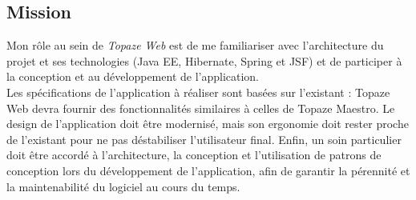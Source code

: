 \subsection{Mission}
Mon rôle au sein de \textit{Topaze Web} est de me familiariser avec l'architecture du projet et ses technologies (\gls{Java EE}, \gls{Hibernate}, \gls{Spring} et \gls{JSF}) et de participer à la conception et au développement de l'application.\\

Les spécifications de l’application à réaliser sont basées sur l'existant : Topaze Web devra fournir des fonctionnalités similaires à celles de Topaze Maestro. Le design de l'application doit être modernisé, mais son ergonomie doit rester proche de l'existant pour ne pas déstabiliser l'utilisateur final. Enfin, un soin particulier doit être accordé à l'architecture, la conception et l'utilisation de patrons de conception lors du développement de l'application, afin de garantir la pérennité et la maintenabilité du logiciel au cours du temps. 




